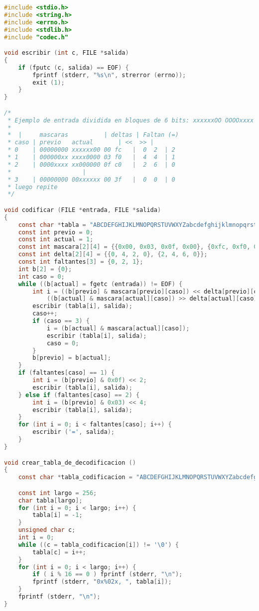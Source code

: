 \documentclass[a4paper,11pt, margin=1in]{article}
\begin{document}
\begin{lstlisting}[language=C,breaklines=true]
#include <stdio.h>
#include <string.h>
#include <errno.h>
#include <stdlib.h>
#include "codec.h"

void escribir (int c, FILE *salida)
{
	if (fputc (c, salida) == EOF) {
		fprintf (stderr, "%s\n", strerror (errno));
		exit (1);
	}
}

/*
 * Ejemplo de entrada dividida en bloques de 6 bits: xxxxxxOO OOOOxxxx xxOOOOOO xxxxxxOO OOOOxxxx
 *
 *	|     mascaras			| deltas | Faltan (=)
 * caso	| previo   actual		| <<  >> |
 * 0	| 00000000 xxxxxx00	00 fc	|  0  2	 | 2
 * 1	| 000000xx xxxx0000	03 f0	|  4  4  | 1
 * 2	| 0000xxxx xx000000	0f c0	|  2  6  | 0
 *                    |
 * 3	| 00000000 00xxxxxx	00 3f	|  0  0  | 0
 * luego repite
 */	

void codificar (FILE *entrada, FILE *salida)
{
	const char *tabla = "ABCDEFGHIJKLMNOPQRSTUVWXYZabcdefghijklmnopqrstuvwxyz0123456789+/";
	const int previo = 0;
	const int actual = 1;
	const int mascara[2][4] = {{0x00, 0x03, 0x0f, 0x00}, {0xfc, 0xf0, 0xc0, 0x3f}};
	const int delta[2][4] = {{0, 4, 2, 0}, {2, 4, 6, 0}};
	const int faltantes[3] = {0, 2, 1};
	int b[2] = {0};
	int caso = 0;
	while ((b[actual] = fgetc (entrada)) != EOF) {
		int i = ((b[previo] & mascara[previo][caso]) << delta[previo][caso]) |
			((b[actual] & mascara[actual][caso]) >> delta[actual][caso]);
		escribir (tabla[i], salida);
		caso++;
		if (caso == 3) {
			i = (b[actual] & mascara[actual][caso]);
			escribir (tabla[i], salida);
			caso = 0;
		}
		b[previo] = b[actual];
	}
	if (faltantes[caso] == 1) {
		int i = (b[previo] & 0x0f) << 2;
		escribir (tabla[i], salida);
	} else if (faltantes[caso] == 2) {
		int i = (b[previo] & 0x03) << 4;
		escribir (tabla[i], salida);
	}
	for (int i = 0; i < faltantes[caso]; i++) {
		escribir ('=', salida);
	}
}

void crear_tabla_de_decodificacion ()
{
	const char *tabla_codificacion = "ABCDEFGHIJKLMNOPQRSTUVWXYZabcdefghijklmnopqrstuvwxyz0123456789+/";

	const int largo = 256;
	char tabla[largo];
	for (int i = 0; i < largo; i++) {
		tabla[i] = -1;
	}
	unsigned char c;
	int i = 0;
	while ((c = tabla_codificacion[i]) != '\0') {
		tabla[c] = i++;
	}
	for (int i = 0; i < largo; i++) {
		if ( i % 16 == 0 ) fprintf (stderr, "\n");
		fprintf (stderr, "0x%02x, ", tabla[i]);
	}
	fprintf (stderr, "\n");
}


\end{lstlisting}
\end{document}
